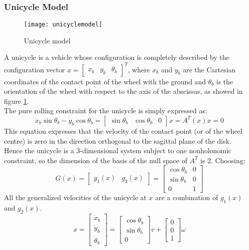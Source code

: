 \subsubsection{Unicycle Model}
\begin{figure}[h!]
	\centering
	\texttt{[image: unicyclemodel]}
	\caption{Unicycle model}
	\label{fig:unicyclemodel}
\end{figure}
A unicycle is a vehicle whose configuration is completely described by the configuration vector $x = \left[\begin{matrix}x_b&y_b&\theta_b\end{matrix}\right]^T$, where $x_b$ and $y_b$ are the Cartesian coordinates of the contact point of the wheel with the ground and $\theta_b$ is the orientation of the wheel with respect to the axis of the abscissas, as showed in figure \ref{fig:unicyclemodel}. \\
The pure rolling constraint for the unicycle is simply expressed as:
\begin{equation} \label{At}
\dot{x}_b\sin\theta_b-\dot{y}_b\cos\theta_b=\left[
\begin{matrix}
\sin\theta_b & \cos\theta_b & 0
\end{matrix}
\right] \dot{x}= A^T \left( x \right)\dot{x} =0  
\end{equation}
This equation expresses that the velocity of the contact point (or of the wheel centre) is zero in the direction orthogonal to the sagittal plane of the disk.\\
Hence the unicycle is a 3-dimensional system subject to one nonholonomic constraint, so the dimension of the basis of the null space of $A^T$ is 2. Choosing:
\begin{equation} \label{Gmatrix_def}
G(x)=\left[
\begin{matrix}
g_1 (x) & g_2 (x)
\end{matrix}
\right] =  \left[
\begin{matrix}
\cos\theta_b & 0 \\
\sin\theta_b & 0 \\
0 & 1 
\end{matrix}
\right] 
\end{equation}
All the generalized velocities of the unicycle at $x$ are a combination of $g_1 (x)$ and $g_2 (x)$.
\begin{equation} 
\dot{x}=\left[
\begin{matrix}
\dot{x}_b \\ \dot{y}_b \\\dot{\theta}_b
\end{matrix}
\right] =  \left[
\begin{matrix}
\cos\theta_b \\ \sin\theta_b \\ 0 
\end{matrix}
\right]v + \left[
\begin{matrix}
0 \\ 0 \\ 1 
\end{matrix}
\right]\omega
\end{equation}
